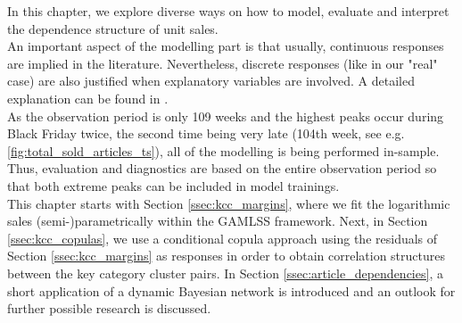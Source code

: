 
In this chapter, we explore diverse ways on how to model, evaluate and interpret the dependence structure of unit sales. 
\\





An important aspect of the modelling part is that usually, continuous responses are implied in the literature. Nevertheless, discrete responses (like in our "real" case) are also justified when explanatory variables are involved. A detailed explanation can be found in \cite{trivedi2017note}.\\ 
As the observation period is only 109 weeks and the highest peaks occur during Black Friday twice, the second time being very late (104th week, see e.g. \autoref{fig:total_sold_articles_ts}), all of the modelling is being performed in-sample. Thus, evaluation and diagnostics are based on the entire observation period so that both extreme peaks can be included in model trainings.\\
This chapter starts with Section \ref{ssec:kcc_margins}, where we fit the logarithmic sales (semi-)parametrically within the \ac{GAMLSS} framework. Next, in Section \ref{ssec:kcc_copulas}, we use a conditional copula approach using the residuals of Section \ref{ssec:kcc_margins} as responses in order to obtain correlation structures between the key category cluster pairs. In Section \ref{ssec:article_dependencies}, a short application of a dynamic Bayesian network is introduced and an outlook for further possible research is discussed. %


